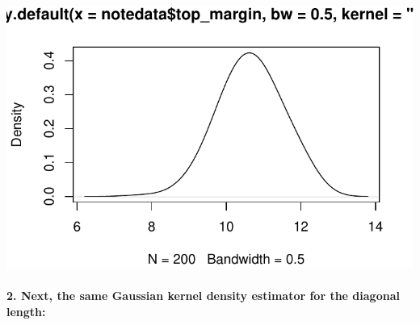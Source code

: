 \documentclass[
]{article}
\newenvironment{Shaded}{\begin{snugshade}}{\end{snugshade}}
\newcommand{\DataTypeTok}[1]{\textcolor[rgb]{0.13,0.29,0.53}{#1}}
\newcommand{\FloatTok}[1]{\textcolor[rgb]{0.00,0.00,0.81}{#1}}
\newcommand{\KeywordTok}[1]{\textcolor[rgb]{0.13,0.29,0.53}{\textbf{#1}}}
\newcommand{\NormalTok}[1]{#1}
\newcommand{\OperatorTok}[1]{\textcolor[rgb]{0.81,0.36,0.00}{\textbf{#1}}}
\newcommand{\StringTok}[1]{\textcolor[rgb]{0.31,0.60,0.02}{#1}}
\begin{document}
\begin{Shaded}
\end{Shaded}

\begin{center}\includegraphics{2.0-Multivariate-Visualization-Assignment_files/figure-latex/unnamed-chunk-11-1} \end{center}

\hypertarget{next-the-same-gaussian-kernel-density-estimator-for-the-diagonal-length}{%
\paragraph{\texorpdfstring{\textbf{2. Next, the same Gaussian kernel
density estimator for the diagonal
length:}}{2. Next, the same Gaussian kernel density estimator for the diagonal length:}}\label{next-the-same-gaussian-kernel-density-estimator-for-the-diagonal-length}}

\begin{Shaded}
\end{Shaded}
\end{document}
